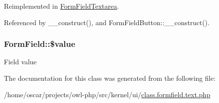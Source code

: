 Reimplemented in \hyperlink{classFormFieldTextarea_a85348034822c70694fc8640bfcacc04d}{FormFieldTextarea}.



Referenced by \_\-\_\-construct(), and FormFieldButton::\_\-\_\-construct().

\subsubsection[{\$value}]{\setlength{\rightskip}{0pt plus 5cm}FormField::\$value}\label{classFormField_a3c01e89834248eec8e2f145fbcfa0fbc}
Field value 

The documentation for this class was generated from the following file:\begin{DoxyCompactItemize}
\item 
/home/oscar/projects/owl-\/php/src/kernel/ui/\hyperlink{class_8formfield_8text_8php}{class.formfield.text.php}\end{DoxyCompactItemize}
